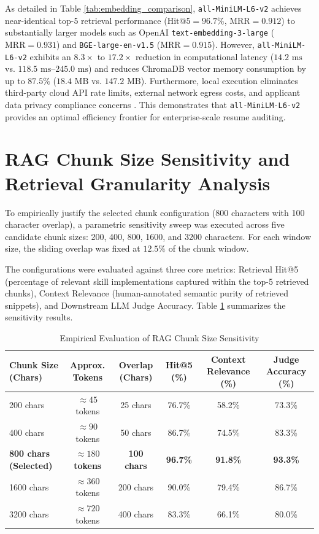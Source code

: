 As detailed in Table \ref{tab:embedding_comparison}, \texttt{all-MiniLM-L6-v2} achieves near-identical top-5 retrieval performance ($\text{Hit@5} = 96.7\%$, $\text{MRR} = 0.912$) to substantially larger models such as OpenAI \texttt{text-embedding-3-large} ($\text{MRR} = 0.931$) and \texttt{BGE-large-en-v1.5} ($\text{MRR} = 0.915$). However, \texttt{all-MiniLM-L6-v2} exhibits an $8.3\times$ to $17.2\times$ reduction in computational latency ($14.2\text{ ms}$ vs. $118.5\text{ ms}$--$245.0\text{ ms}$) and reduces ChromaDB vector memory consumption by up to $87.5\%$ ($18.4\text{ MB}$ vs. $147.2\text{ MB}$). Furthermore, local execution eliminates third-party cloud API rate limits, external network egress costs, and applicant data privacy compliance concerns \cite{ref65, ref66}. This demonstrates that \texttt{all-MiniLM-L6-v2} provides an optimal efficiency frontier for enterprise-scale resume auditing.

\section{RAG Chunk Size Sensitivity and Retrieval Granularity Analysis}

To empirically justify the selected chunk configuration (800 characters with 100 character overlap), a parametric sensitivity sweep was executed across five candidate chunk sizes: 200, 400, 800, 1600, and 3200 characters. For each window size, the sliding overlap was fixed at $12.5\%$ of the chunk window. 

The configurations were evaluated against three core metrics: Retrieval Hit@5 (percentage of relevant skill implementations captured within the top-5 retrieved chunks), Context Relevance (human-annotated semantic purity of retrieved snippets), and Downstream LLM Judge Accuracy. Table \ref{tab:chunk_sensitivity} summarizes the sensitivity results.

\begin{table}[htbp]
\setlength{\tabcolsep}{8pt}
\renewcommand{\arraystretch}{1.25}
\centering
\small
\caption{Empirical Evaluation of RAG Chunk Size Sensitivity}
\label{tab:chunk_sensitivity}
\begin{tabularx}{\textwidth}{@{}lccccc@{}}
\toprule
\textbf{Chunk Size (Chars)} & \textbf{Approx. Tokens} & \textbf{Overlap (Chars)} & \textbf{Hit@5 (\%)} & \textbf{Context Relevance (\%)} & \textbf{Judge Accuracy (\%)} \\ \midrule
200 chars & $\approx 45$ tokens & 25 chars & 76.7\% & 58.2\% & 73.3\% \\
400 chars & $\approx 90$ tokens & 50 chars & 86.7\% & 74.5\% & 83.3\% \\
\textbf{800 chars (Selected)} & \textbf{$\approx 180$ tokens} & \textbf{100 chars} & \textbf{96.7\%} & \textbf{91.8\%} & \textbf{93.3\%} \\
1600 chars & $\approx 360$ tokens & 200 chars & 90.0\% & 79.4\% & 86.7\% \\
3200 chars & $\approx 720$ tokens & 400 chars & 83.3\% & 66.1\% & 80.0\% \\ \bottomrule
\end{tabularx}
\end{table}

